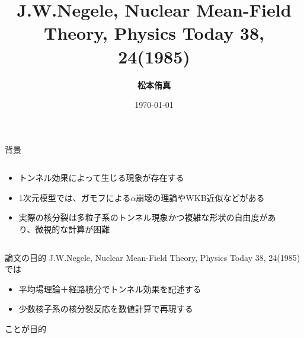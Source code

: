 \documentclass[14pt,aspectratio=169,xcolor=dvipsnames,table,dvipdfmx]{beamer}
\title{J.W.Negele, Nuclear Mean-Field Theory, Physics Today 38, 24(1985)}
\author{\textbf{松本侑真}}
\date{\today}
\institute{原子核理論 関澤研究室}
\theoremstyle{definition}
\begin{document}
\maketitle




\begin{frame}{背景}
  \begin{columns}[t]
    \begin{column}{.5\textwidth}
      \begin{itemize}
        \item トンネル効果によって生じる現象が存在する
        \item 1次元模型では、ガモフによる$\alpha$崩壊の理論やWKB近似などがある
        \item 実際の核分裂は多粒子系のトンネル現象かつ複雑な形状の自由度があり、微視的な計算が困難
      \end{itemize}
    \end{column}
    \begin{column}{.5\textwidth}
    \end{column}
  \end{columns}
\end{frame}

\begin{frame}{論文の目的}
  J.W.Negele, Nuclear Mean-Field Theory, Physics Today 38, 24(1985)では
  \begin{itemize}
    \item 平均場理論＋経路積分でトンネル効果を記述する
    \item 少数核子系の核分裂反応を数値計算で再現する
  \end{itemize}
  ことが目的
\end{frame}
\end{document}
